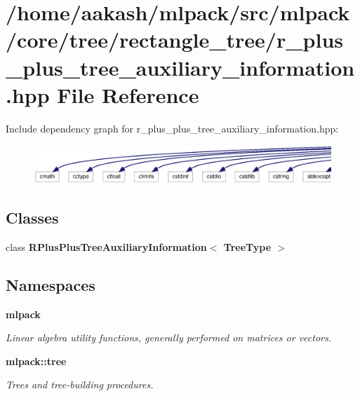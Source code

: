 \section{/home/aakash/mlpack/src/mlpack/core/tree/rectangle\+\_\+tree/r\+\_\+plus\+\_\+plus\+\_\+tree\+\_\+auxiliary\+\_\+information.hpp File Reference}
\label{r__plus__plus__tree__auxiliary__information_8hpp}
Include dependency graph for r\+\_\+plus\+\_\+plus\+\_\+tree\+\_\+auxiliary\+\_\+information.\+hpp\+:
\nopagebreak
\begin{figure}[H]
\begin{center}
\leavevmode
\includegraphics[width=350pt]{r__plus__plus__tree__auxiliary__information_8hpp__incl}
\end{center}
\end{figure}
\subsection*{Classes}
\begin{DoxyCompactItemize}
\item 
class \textbf{ R\+Plus\+Plus\+Tree\+Auxiliary\+Information$<$ Tree\+Type $>$}
\end{DoxyCompactItemize}
\subsection*{Namespaces}
\begin{DoxyCompactItemize}
\item 
 \textbf{ mlpack}
\begin{DoxyCompactList}\small\item\em Linear algebra utility functions, generally performed on matrices or vectors. \end{DoxyCompactList}\item 
 \textbf{ mlpack\+::tree}
\begin{DoxyCompactList}\small\item\em Trees and tree-\/building procedures. \end{DoxyCompactList}\end{DoxyCompactItemize}


